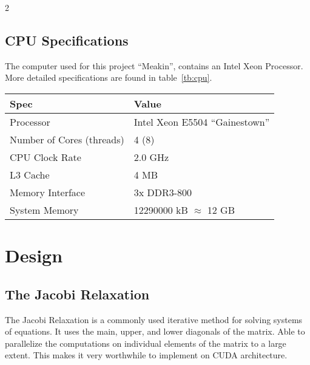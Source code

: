 \documentclass[10pt]{article}
\begin{document}
\begin{multicols}{2}
  \subsection{CPU Specifications}
  The computer used for this project ``Meakin'', contains an Intel Xeon Processor. More detailed specifications are found in table~\ref{tb:cpu}.
  \begin{table*}[!ht]\centering
    \begin{tabular}{@{}l l@{}}\toprule
      \bf{Spec}                     &   \bf{Value}                      \\
      \hline
      Processor                     &   Intel Xeon E5504 ``Gainestown'' \\
      Number of Cores (threads)     &   4 (8)                           \\
      CPU Clock Rate                &   2.0 GHz                         \\
      L3 Cache                      &   4 MB                            \\
      Memory Interface              &   3x DDR3-800                     \\
      System Memory                 &   12290000 kB $\approx$ 12 GB     \\
      \hline
    \end{tabular}
    \caption{Meakin CPU specifications}
    \label{tb:cpu}
  \end{table*}

  \section{Design}
  \subsection{The Jacobi Relaxation}
  The Jacobi Relaxation is a commonly used iterative method for solving systems of equations.
  It uses the main, upper, and lower diagonals of the matrix.
  Able to parallelize the computations on individual elements of the matrix to a large extent.
  This makes it very worthwhile to implement on CUDA architecture.


\end{multicols}
\end{document}
